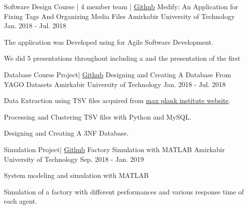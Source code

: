 \documentclass[11pt, a4paper]{awesome-cv}
\begin{document}
\begin{cventries}
	
	\cventry
	{Software Design Course | 4 member team | \href{https://github.com/pouyaaghahoseini/Medify}{\faGithubSquare\acvHeaderIconSep Github}} %
	{Medify: An Application for Fixing Tags And Organizing Media Files} %
	{Amirkabir University of Technology} %
	{Jan. 2018 - Jul. 2018} %
	{
		\begin{cvitems} %
			\item {The application was Developed using  for Agile Software Development.}
			\item {We did 5 presentations throughout including a  and the presentation of the first }
		\end{cvitems}
	}
	
	\cventry
	{Database Course Project| \href{https://github.com/pouyaaghahoseini/Database-Course}{\faGithubSquare\acvHeaderIconSep Github}} %
	{Designing and Creating A Database From YAGO Datasets} %
	{Amirkabir University of Technology} %
	{Jan. 2018 - Jul. 2018} %
	{
		\begin{cvitems} %
			\item {Data Extraction using TSV files acquired from \href{https://www.mpi-inf.mpg.de/departments/databases-and-information-systems/research/yago-naga/yago/downloads/}{max plank institute website}.}
			\item {Processing and Clustering TSV files with Python and MySQL.}
			\item {Designing and Creating A 3NF Database.}
		\end{cvitems}
	}
	
	\cventry
	{Simulation  Project| \href{https://github.com/pouyaaghahoseini/System-Queueing-Simulation}{\faGithubSquare\acvHeaderIconSep Github}} %
	{Factory Simulation with MATLAB} %
	{Amirkabir University of Technology} %
	{Sep. 2018 - Jan. 2019} %
	{
		\begin{cvitems} %
			\item {System modeling and simulation with MATLAB}
			\item {Simulation of a factory with different performances and various response time of each agent.}	
		\end{cvitems}
	}
\end{cventries}
\end{document}
